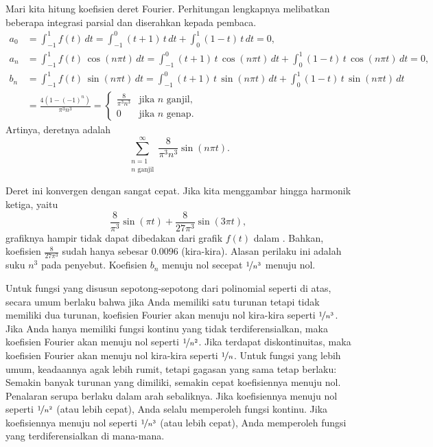 \begin{example}
Mari kita hitung koefisien deret Fourier.  Perhitungan lengkapnya
melibatkan beberapa integrasi parsial dan diserahkan kepada pembaca.
\begin{align*}
a_0 & = 
\int_{-1}^1
f(t) \, dt = 
\int_{-1}^0
(t+1)\,t \, dt +
\int_0^1
(1-t)\,t \, dt = 0 , \\
a_n & = 
\int_{-1}^1
f(t) \, \cos (n\pi t) \, dt = 
\int_{-1}^0
(t+1)\,t
\, \cos (n \pi t) \, dt +
\int_0^1
(1-t)\,t
\, \cos (n \pi t) \, dt = 0, \\
b_n & = 
\int_{-1}^1
f(t) \, \sin (n\pi t) \, dt = 
\int_{-1}^0
(t+1)\,t
\, \sin (n \pi t) \, dt +
\int_0^1
(1-t)\,t
\, \sin (n \pi t) \, dt \\
& =
\frac{4 ( 1-{(-1)}^n)}{\pi^3 n^3} 
=
\begin{cases}
\frac{8}{\pi^3 n^3} & \text{jika } n \text{ ganjil} , \\
0 & \text{jika } n \text{ genap} .
\end{cases}
\end{align*}
Artinya, deretnya adalah
\begin{equation*}
\sum_{\substack{n=1 \\ n \text{ ganjil}}}^\infty \frac{8}{\pi^3 n^3} \sin (n \pi t) .
\end{equation*}

Deret ini konvergen dengan sangat cepat.
Jika kita menggambar hingga
harmonik ketiga, yaitu
\begin{equation*}
\frac{8}{\pi^3} \sin (\pi t) + 
\frac{8}{27 \pi^3} \sin (3 \pi t) ,
\end{equation*}
grafiknya hampir tidak dapat dibedakan dari grafik $f(t)$ dalam
.
Bahkan, koefisien
$\frac{8}{27 \pi^3}$ sudah hanya sebesar $0.0096$ (kira-kira).
Alasan perilaku ini adalah suku $n^3$ pada penyebut.
Koefisien $b_n$ menuju nol secepat
$\nicefrac{1}{n^3}$ menuju
nol.
\end{example}

Untuk fungsi yang disusun sepotong-sepotong dari polinomial seperti di atas,
secara umum berlaku bahwa
jika Anda memiliki satu turunan tetapi tidak memiliki dua turunan,
koefisien Fourier
akan menuju nol kira-kira seperti $\nicefrac{1}{n^3}$.
Jika Anda
hanya memiliki fungsi kontinu yang tidak terdiferensialkan,
maka koefisien Fourier akan menuju
nol seperti $\nicefrac{1}{n^2}$.  Jika terdapat diskontinuitas, maka
koefisien Fourier akan menuju nol kira-kira seperti $\nicefrac{1}{n}$.
Untuk fungsi yang lebih umum, keadaannya agak lebih rumit, tetapi
gagasan yang sama tetap berlaku: Semakin banyak turunan yang dimiliki, semakin cepat koefisiennya
menuju nol.  Penalaran serupa berlaku dalam arah sebaliknya.  Jika koefisiennya menuju
nol seperti $\nicefrac{1}{n^2}$ (atau lebih cepat),
Anda selalu memperoleh fungsi kontinu.  Jika
koefisiennya menuju nol seperti $\nicefrac{1}{n^3}$ (atau lebih cepat),
Anda memperoleh fungsi yang terdiferensialkan
di mana-mana.

